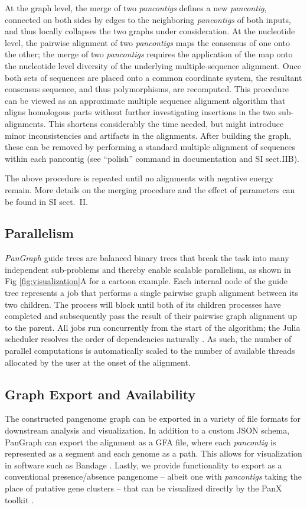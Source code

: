 \documentclass[aps,rmp,preprint,superscriptaddress,10pt,linenumbers]{revtex4-1}
\newcommand{\SIalgo}{II}
\begin{document}
At the graph level, the merge of two \emph{pancontigs} defines a new \emph{pancontig}, connected on both sides by edges to the neighboring \emph{pancontigs} of both inputs, and thus locally collapses the two graphs under consideration.
At the nucleotide level, the pairwise alignment of two \emph{pancontigs} maps the consensus of one onto the other; the merge of two \emph{pancontigs} requires the application of the map onto the nucleotide level diversity of the underlying multiple-sequence alignment.
Once both sets of sequences are placed onto a common coordinate system, the resultant consensus sequence, and thus polymorphisms, are recomputed.
This procedure can be viewed as an approximate multiple sequence alignment algorithm that aligns homologous parts without further investigating insertions in the two sub-alignments. This shortens considerably the time needed, but might introduce minor inconsistencies and artifacts in the alignments. 
After building the graph, these can be removed by performing a standard multiple alignment of sequences within each pancontig (see ``polish'' command in documentation and SI sect.{\SIalgo}B).

The above procedure is repeated until no alignments with negative energy remain.
More details on the merging procedure and the effect of parameters can be found in SI sect.~\SIalgo.

\subsection{Parallelism}
\emph{PanGraph} guide trees are balanced binary trees that break the task into many independent sub-problems and thereby enable scalable parallelism, as shown in Fig \ref{fig:visualization}A for a cartoon example.
Each internal node of the guide tree represents a job that performs a single pairwise graph alignment between its two children.
The process will block until both of its children processes have completed and subsequently pass the result of their pairwise graph alignment up to the parent.
All jobs run concurrently from the start of the algorithm; the Julia scheduler resolves the order of dependencies naturally \cite{bezanson2017julia}.
As such, the number of parallel computations is automatically scaled to the number of available threads allocated by the user at the onset of the alignment.

\subsection{Graph Export and Availability}
The constructed pangenome graph can be exported in a variety of file formats for downstream analysis and visualization.
In addition to a custom JSON schema, PanGraph can export the alignment as a GFA file, where each \emph{pancontig} is represented as a segment and each genome as a path.
This allows for visualization in software such as Bandage \cite{wick2015bandage}.
Lastly, we provide functionality to export as a conventional presence/absence pangenome {--} albeit one with \emph{pancontigs} taking the place of putative gene clusters {--} that can be visualized directly by the PanX toolkit \cite{ding2018panx}.
\end{document}

